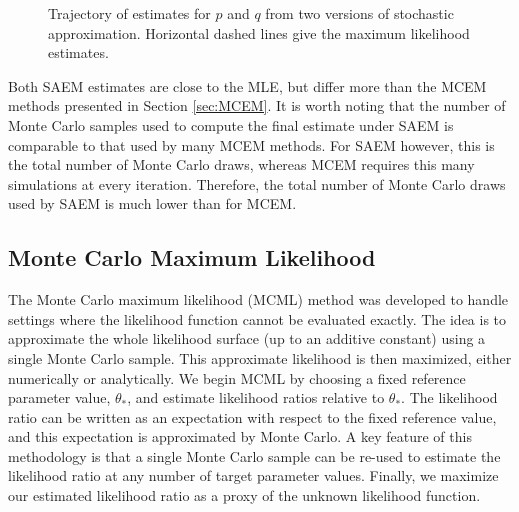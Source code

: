 \documentclass[11pt, oneside]{article}   	%
\begin{document}
\begin{figure}
    \centering
    \caption{Trajectory of estimates for $p$ and $q$ from two versions of stochastic approximation. Horizontal dashed lines give the maximum likelihood estimates.}

    
    \label{fig:blood_SAEM_traj}
\end{figure}


Both SAEM estimates are close to the MLE, but differ more than the MCEM methods presented in Section \ref{sec:MCEM}. It is worth noting that the number of Monte Carlo samples used to compute the final estimate under SAEM is comparable to that used by many MCEM methods. For SAEM however, this is the total number of Monte Carlo draws, whereas MCEM requires this many simulations at every iteration. Therefore, the total number of Monte Carlo draws used by SAEM is much lower than for MCEM.




\subsection{Monte Carlo Maximum Likelihood}
\label{sec:MCML}

The Monte Carlo maximum likelihood (MCML) method was developed to handle settings where the likelihood function cannot be evaluated exactly. The idea is to approximate the whole likelihood surface (up to an additive constant) using a single Monte Carlo sample. This approximate likelihood is then maximized, either numerically or analytically. We begin MCML by choosing a fixed reference parameter value, $\theta_*$, and estimate likelihood ratios relative to $\theta_*$. The likelihood ratio can be written as an expectation with respect to the fixed reference value, and this expectation is approximated by Monte Carlo. A key feature of this methodology is that a single Monte Carlo sample can be re-used to estimate the likelihood ratio at any number of target parameter values. Finally, we maximize our estimated likelihood ratio as a proxy of the unknown likelihood function.
\end{document}
